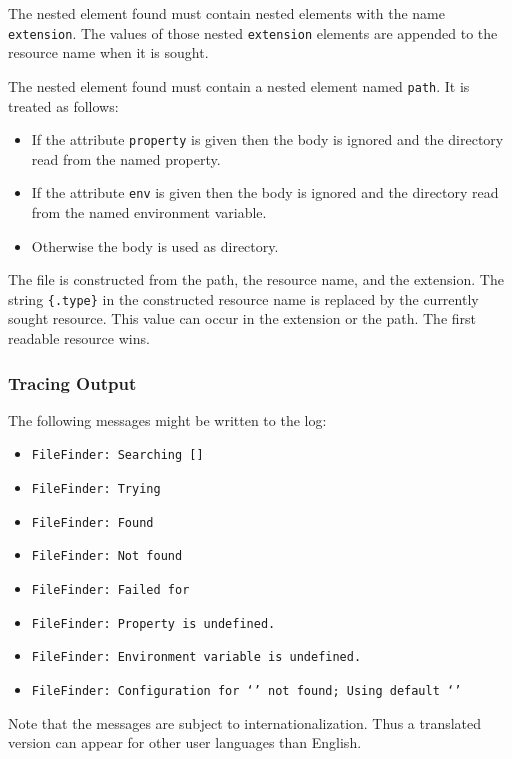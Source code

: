 The nested element found must contain nested elements with the name
\texttt{extension}. The values of those nested \texttt{extension}
elements are appended to the resource name when it is sought.

The nested element found must contain a nested element named
\texttt{path}. It is treated as follows:
\begin{itemize}
\item If the attribute \texttt{property} is given then the body is
  ignored and the directory read from the named property.
\item If the attribute \texttt{env} is given then the body is ignored
  and the directory read from the named environment variable.
\item Otherwise the body is used as directory.
\end{itemize}

The file is constructed from the path, the resource name, and the
extension. The string \verb|{.type}| in the constructed resource name
is replaced by the currently sought resource. This value can occur in
the extension or the path. The first readable resource wins.

\subsubsection*{Tracing Output}

The following messages might be written to the log:

{\small
\begin{itemize}
\item{\tt FileFinder: Searching  []}
\item{\tt FileFinder: Trying }
\item{\tt FileFinder: Found }
\item{\tt FileFinder: Not found }
\item{\tt FileFinder: Failed for }
\item{\tt FileFinder: Property  is undefined.}
\item{\tt FileFinder: Environment variable  is undefined.}
\item{\tt FileFinder: Configuration for `' not found;
    Using default `'}
\end{itemize}}

Note that the messages are subject to internationalization. Thus a
translated version can appear for other user languages than English.


